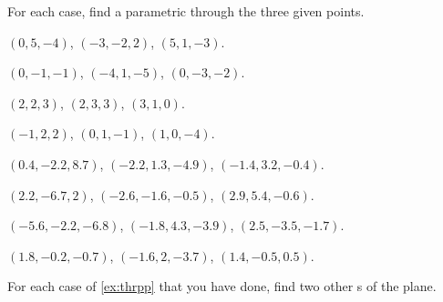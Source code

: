 \begin{exercise} \label{ex:thrpp} 
For each case, find a parametric  through the three given points.
\begin{Parts}
\item 
\((0,5,-4)\),
\((-3,-2,2)\),
\((5,1,-3)\).

\item
\((0,-1,-1)\),
\((-4,1,-5)\),
\((0,-3,-2)\).

\begin{OmitV1}
\item 
\((2,2,3)\),
\((2,3,3)\),
\((3,1,0)\).

\item
\((-1,2,2)\),
\((0,1,-1)\),
\((1,0,-4)\).

\item
\((0.4,-2.2,8.7)\),
\((-2.2,1.3,-4.9)\),
\((-1.4,3.2,-0.4)\).

\item
\((2.2,-6.7,2)\),
\((-2.6,-1.6,-0.5)\),
\((2.9,5.4,-0.6)\).
\end{OmitV1}

\item
\((-5.6,-2.2,-6.8)\),
\((-1.8,4.3,-3.9)\),
\((2.5,-3.5,-1.7)\).

\item
\((1.8,-0.2,-0.7)\),
\((-1.6,2,-3.7)\),
\((1.4,-0.5,0.5)\).

\end{Parts}
\end{exercise}


\begin{exercise}  
For each case of \cref{ex:thrpp} that you have done, find two other s of the plane.
\end{exercise}




